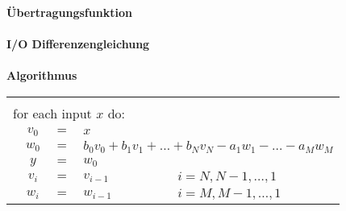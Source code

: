 	\begin{minipage}{0.57\textwidth}
		\textbf{Übertragungsfunktion}\\[0.2cm]
		\\[0.4cm]
		\textbf{I/O Differenzengleichung}\\[0.2cm]
		\\[0.4cm]
		\textbf{Algorithmus}\\[0.2cm]
		\begin{tabular}{|lclll|}
		 \hline &&&&$ $\\[-0.3cm]
		 \multicolumn{5}{|l|}{for each input $x$ do:}\\
		  &$v_0$&$ =$& $x$&\\
		  &$w_0$&$ = $&\multicolumn{2}{l|}{$b_0v_0 + b_1v_1 + \hdots + b_Nv_N - a_1w_1- \hdots  - a_Mw_M$}\\
		  &$y$&$ =$&$ w_0$&\\
		  &$v_i$&$ =$&$ v_{i-1}$ & $\qquad \quad i = N,N-1,\hdots,1$\\
		  &$w_i$& $=$&$ w_{i-1}$ & $\qquad \quad i = M,M-1,\hdots,1$\\[0.1cm]
		 \hline
		\end{tabular}
	\end{minipage}
